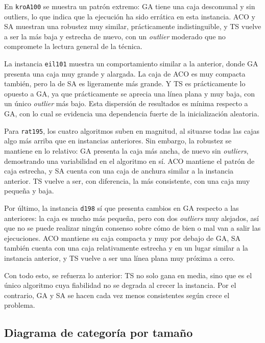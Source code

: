 En \texttt{kroA100} se muestra un patrón extremo: GA tiene una caja descomunal y sin outliers, lo que indica que la ejecución
ha sido errática en esta instancia. ACO y SA muestran una robustez muy similar, prácticamente indistinguible, y TS vuelve a 
ser la más baja y estrecha de nuevo, con un \textit{outlier} moderado que no compromete la lectura general de la técnica.

La instancia \texttt{eil101} muestra un comportamiento similar a la anterior, donde GA presenta una caja muy grande y alargada.
La caja de ACO es muy compacta también, pero la de SA es ligeramente más grande. Y TS es prácticamente lo opuesto a GA, ya que
prácticamente se aprecia una línea plana y muy baja, con un único \textit{outlier} más bajo. Esta dispersión de resultados es
mínima respecto a GA, con lo cual se evidencia una dependencia fuerte de la inicialización aleatoria.

Para \texttt{rat195}, los cuatro algoritmos suben en magnitud, al situarse todas las cajas algo más arriba que en instancias
anteriores. Sin embargo, la robustez se mantiene en lo relativo: GA presenta la caja más ancha, de nuevo sin \textit{outliers},
demostrando una variabilidad en el algoritmo en sí. ACO mantiene el patrón de caja estrecha, y SA cuenta con una caja de
anchura similar a la instancia anterior. TS vuelve a ser, con diferencia, la más consistente, con una caja muy pequeña y baja.

Por último, la instancia \texttt{d198} sí que presenta cambios en GA respecto a las anteriores: la caja es mucho más pequeña,
pero con dos \textit{outliers} muy alejados, así que no se puede realizar ningún consenso sobre cómo de bien o mal van a 
salir las ejecuciones. ACO mantiene su caja compacta y muy por debajo de GA, SA también cuenta con una caja relativamente
estrecha y en un lugar similar a la instancia anterior, y TS vuelve a ser una línea plana muy próxima a cero.

Con todo esto, se refuerza lo anterior: TS no solo gana en media, sino que es el único algoritmo cuya fiabilidad no se degrada
al crecer la instancia. Por el contrario, GA y SA se hacen cada vez menos consistentes según crece el problema.

\newpage

\subsection{Diagrama de categoría por tamaño}
\label{subsec:boxplot_cat}

